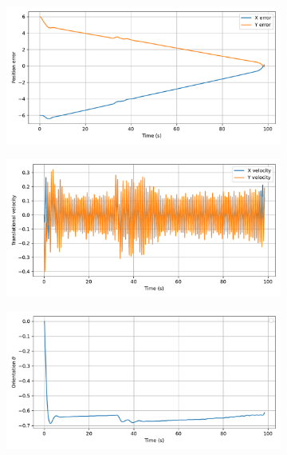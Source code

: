 \begin{figure}[H]
    \centering
    \begin{subfigure}{0.45\linewidth}
        \centering
        \includegraphics[width=\linewidth]{figures/Simulations/sim1circles/evolution_0.pdf}
    \end{subfigure}
    \begin{subfigure}{0.45\linewidth}
        \centering
        \includegraphics[width=\linewidth]{figures/Simulations/sim1circles/evolution_1.pdf}
    \end{subfigure}
    \hfill
    \begin{subfigure}{0.45\linewidth}
        \centering
        \includegraphics[width=\linewidth]{figures/Simulations/sim1circles/evolution_2.pdf}

\end{subfigure}
\end{figure}
